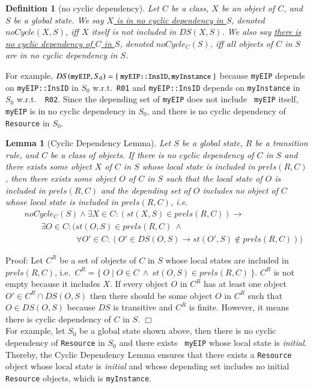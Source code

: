 \documentclass[12pt]{report}
\newtheorem{lemma}{Lemma}
\newtheorem{definition}{Definition}
\newcommand{\ra}{\rightarrow}
\newcommand{\mbstt}[1]{\mbox{\small{\tt {#1}}}}
\newcommand{\stt}[1]{{\small{\tt {#1}}}}
\newcommand{\ul}{\underline}
\begin{document}
\begin{definition}[no cyclic dependency]
Let $C$ be a class, $X$ be an object of $C$, and $S$ be a global
state. We say \ul{$X$ is in no cyclic dependency in $S$}, denoted
\ul{$noCycle(X,S)$}, iff $X$ itself is not included in $DS(X,S)$. We
also say \ul{there is no cyclic dependency of $C$ in $S$}, denoted
\ul{$noCycle_C(S)$}, iff all objects of $C$ in $S$ are in no cyclic
dependency in $S$.
\end{definition}
For example, $DS(\mbstt{myEIP},S_0) =
\{~\mbstt{myEIP::InsID},\mbstt{myInstance}~\}$ because {\tt myEIP}
depends on \stt{myEIP::InsID} in $S_0$ w.r.t.\ {\tt R01} and
\stt{myEIP::InsID} depends on {\tt myInstance} in $S_0$ w.r.t.\ {\tt
  R02}. Since the depending set of {\tt myEIP} does not include {\tt
  myEIP} itself, {\tt myEIP} is in no cyclic dependency in $S_0$, and
there is no cyclic dependency of {\tt Resource} in $S_0$.
\begin{lemma}[Cyclic Dependency Lemma]
Let $S$ be a global state, $R$ be a transition rule, and $C$ be a
class of objects. If there is no cyclic dependency of $C$ in $S$
and there exists some object $X$ of $C$ in $S$ whose local state
is included in $prels(R,C)$, then there exists some object $O$ of $C$ in
$S$ such that the local state of $O$ is included in $prels(R,C)$ and the
depending set of $O$ includes no object of $C$ whose local
state is included in $prels(R,C)$, i.e.
\begin{eqnarray*}
&&noCycle_C(S)\land\exists X\in C:(st(X,S)\in prels(R,C)) \ra\\
&&\:\:\:\:\:\:\:\:\:\exists O\in C:(st(O,S)\in prels(R,C)\ \land\\
&&\:\:\:\:\:\:\:\:\:\:\:\:\:\:\:\:\:\:\:\:\:\:\:\:\:\:\:\:
\forall O'\in C:(O'\in DS(O,S)\ra st(O',S)\not\in prels(R,C)))
\end{eqnarray*}
\end{lemma}
Proof: Let $C^R$ be a set of objects of $C$ in $S$ whose local states
are included in $prels(R,C)$, i.e.\ $C^R=\{~O\mid O\in C~\land~
st(O,S)\in prels(R,C)~\}$. $C^R$ is not empty because it includes $X$.
If every object $O$ in $C^R$ has at least one object $O' \in C^R\cap
DS(O,S)$ then there should be some object $O$ in $C^R$ such that $O
\in DS(O,S)$ because $DS$ is transitive and $C^R$ is finite. However,
it means there is cyclic dependency of $C$ in $S$. $\Box$\\

\noindent
For example, let $S_0$ be a global state shown above, then there is no
cyclic dependency of {\tt Resource} in $S_0$ and there exists {\tt
  myEIP} whose local state is {\it initial}. Thereby, the Cyclic
Dependency Lemma ensures that there exists a {\tt Resource} object
whose local state is {\it initial} and whose depending set includes no
initial {\tt Resource} objects, which is {\tt myInstance}.
\end{document}
